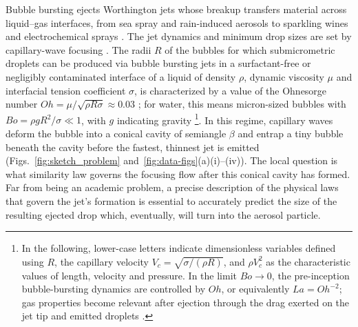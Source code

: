 \documentclass[twocolumn]{revtex4-2}
\begin{document}
Bubble bursting ejects Worthington jets whose breakup transfers material across liquid--gas interfaces, from sea spray \cite{MacIntyre,Bigg,PNAS,AnnRevDeike,JFMGanan,Gananfinespray,PNASWang,Abyss} and rain-induced aerosols \cite{RainPorous} to sparkling wines \cite{SeonLigerBelair2017} and electrochemical sprays \cite{Bashkatov2025}. The jet dynamics and minimum drop sizes are set by capillary-wave focusing \cite{Duchemin,Walls2015,krishnan2017,PRFBird,Deike,Berny}. The radii $R$ of the bubbles for which submicrometric droplets can be produced via bubble bursting jets in a surfactant-free or negligibly contaminated interface of a liquid of density $\rho$, dynamic viscosity $\mu$ and interfacial tension coefficient $\sigma$, is characterized by a value of the Ohnesorge number $Oh=\mu/\sqrt{\rho R\sigma}\approx0.03$ \cite{Walls2015,PRFBird}; for water, this means micron-sized bubbles with $Bo=\rho gR^2/\sigma\ll1$, with $g$ indicating gravity \footnote{In the following, lower-case letters indicate dimensionless variables defined using $R$, the capillary velocity $V_c=\sqrt{\sigma/(\rho R)}$, and $\rho V_c^2$ as the characteristic values of length, velocity and pressure. In the limit $Bo\rightarrow0$, the pre-inception bubble-bursting dynamics are controlled by $Oh$, or equivalently $La=Oh^{-2}$; gas properties become relevant after ejection through the drag exerted on the jet tip and emitted droplets \cite{JFM2020,Tian2023}.}. In this regime, capillary waves deform the bubble into a conical cavity of semiangle $\beta$ and entrap a tiny bubble beneath the cavity before the fastest, thinnest jet is emitted \cite{JFM2019,JFM2020} (Figs.~\ref{fig:sketch_problem} and~\ref{fig:data-figs}(a)(i)--(iv)). The local question is what similarity law governs the focusing flow after this conical cavity has formed. Far from being an academic problem, a precise description of the physical laws that govern the jet's formation is essential to accurately predict the size of the resulting ejected drop which, eventually, will turn into the aerosol particle.
\end{document}
